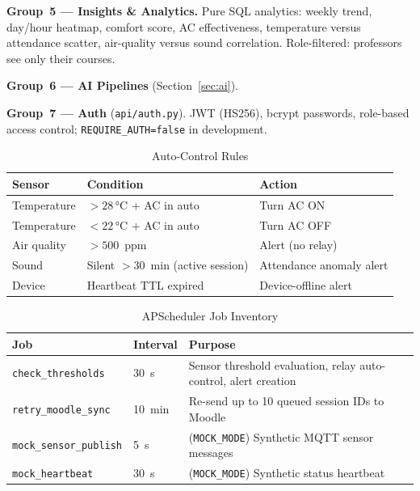 \textbf{Group~5 — Insights \& Analytics.}  Pure SQL analytics: weekly
trend, day/hour heatmap, comfort score, AC effectiveness, temperature
versus attendance scatter, air-quality versus sound correlation.
Role-filtered: professors see only their courses.

\textbf{Group~6 — AI Pipelines} (Section~\ref{sec:ai}).

\textbf{Group~7 — Auth} (\texttt{api/auth.py}).  JWT (HS256), bcrypt
passwords, role-based access control; \texttt{REQUIRE\_AUTH=false} in
development.

\begin{table}[H]
\centering
\caption{Auto-Control Rules}
\label{tab:auto_control}
\begin{tabular}{@{}p{1.6cm}p{2.4cm}p{3.5cm}@{}}
\toprule
\textbf{Sensor} & \textbf{Condition} & \textbf{Action} \\
\midrule
Temperature & $> 28$\,°C + AC in auto & Turn AC ON \\
Temperature & $< 22$\,°C + AC in auto & Turn AC OFF \\
Air quality & $> 500$~ppm            & Alert (no relay) \\
Sound       & Silent $> 30$~min (active session) & Attendance anomaly alert \\
Device      & Heartbeat TTL expired  & Device-offline alert \\
\bottomrule
\end{tabular}
\end{table}

\begin{table}[H]
\centering
\caption{APScheduler Job Inventory}
\label{tab:scheduler_jobs}
\begin{tabular}{@{}p{2.8cm}p{1.1cm}p{3.6cm}@{}}
\toprule
\textbf{Job} & \textbf{Interval} & \textbf{Purpose} \\
\midrule
\texttt{check\_thresholds} & 30~s & Sensor threshold evaluation, relay auto-control, alert creation \\
\texttt{retry\_moodle\_sync} & 10~min & Re-send up to 10 queued session IDs to Moodle \\
\texttt{mock\_sensor\_publish} & 5~s & (\texttt{MOCK\_MODE}) Synthetic MQTT sensor messages \\
\texttt{mock\_heartbeat} & 30~s & (\texttt{MOCK\_MODE}) Synthetic status heartbeat \\
\bottomrule
\end{tabular}
\end{table}

